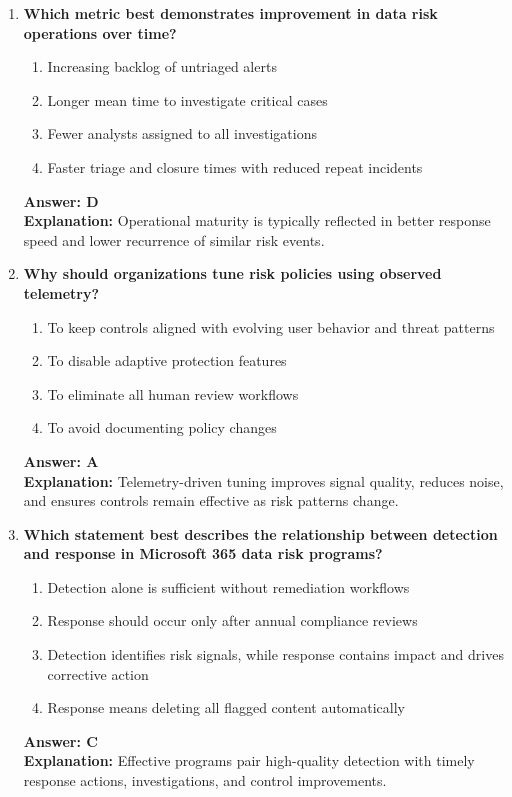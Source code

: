 \documentclass[10pt]{article}
\begin{document}
\begin{enumerate}[leftmargin=*]
\item \textbf{Which metric best demonstrates improvement in data risk operations over time?}
\begin{enumerate}[label=\Alph*.]
  \item Increasing backlog of untriaged alerts
  \item Longer mean time to investigate critical cases
  \item Fewer analysts assigned to all investigations
  \item Faster triage and closure times with reduced repeat incidents
\end{enumerate}
\textbf{Answer: D}\\
\textbf{Explanation:} Operational maturity is typically reflected in better response speed and lower recurrence of similar risk events.

\item \textbf{Why should organizations tune risk policies using observed telemetry?}
\begin{enumerate}[label=\Alph*.]
  \item To keep controls aligned with evolving user behavior and threat patterns
  \item To disable adaptive protection features
  \item To eliminate all human review workflows
  \item To avoid documenting policy changes
\end{enumerate}
\textbf{Answer: A}\\
\textbf{Explanation:} Telemetry-driven tuning improves signal quality, reduces noise, and ensures controls remain effective as risk patterns change.

\item \textbf{Which statement best describes the relationship between detection and response in Microsoft 365 data risk programs?}
\begin{enumerate}[label=\Alph*.]
  \item Detection alone is sufficient without remediation workflows
  \item Response should occur only after annual compliance reviews
  \item Detection identifies risk signals, while response contains impact and drives corrective action
  \item Response means deleting all flagged content automatically
\end{enumerate}
\textbf{Answer: C}\\
\textbf{Explanation:} Effective programs pair high-quality detection with timely response actions, investigations, and control improvements.



\end{enumerate}
\end{document}

